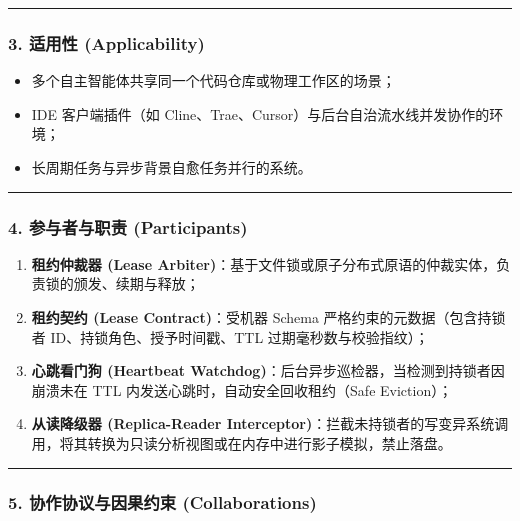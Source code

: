 \begin{center}\rule{0.5\linewidth}{0.5pt}\end{center}

\subsubsection{3. 适用性
(Applicability)}\label{ux9002ux7528ux6027-applicability-9}

\begin{itemize}
\tightlist
\item
  多个自主智能体共享同一个代码仓库或物理工作区的场景；
\item
  IDE 客户端插件（如
  Cline、Trae、Cursor）与后台自治流水线并发协作的环境；
\item
  长周期任务与异步背景自愈任务并行的系统。
\end{itemize}

\begin{center}\rule{0.5\linewidth}{0.5pt}\end{center}

\subsubsection{4. 参与者与职责
(Participants)}\label{ux53c2ux4e0eux8005ux4e0eux804cux8d23-participants-9}

\begin{enumerate}
\def\labelenumi{\arabic{enumi}.}
\tightlist
\item
  \textbf{租约仲裁器 (Lease
  Arbiter)}：基于文件锁或原子分布式原语的仲裁实体，负责锁的颁发、续期与释放；
\item
  \textbf{租约契约 (Lease Contract)}：受机器 Schema
  严格约束的元数据（包含持锁者 ID、持锁角色、授予时间戳、TTL
  过期毫秒数与校验指纹）；
\item
  \textbf{心跳看门狗 (Heartbeat
  Watchdog)}：后台异步巡检器，当检测到持锁者因崩溃未在 TTL
  内发送心跳时，自动安全回收租约（Safe Eviction）；
\item
  \textbf{从读降级器 (Replica-Reader
  Interceptor)}：拦截未持锁者的写变异系统调用，将其转换为只读分析视图或在内存中进行影子模拟，禁止落盘。
\end{enumerate}

\begin{center}\rule{0.5\linewidth}{0.5pt}\end{center}

\subsubsection{5. 协作协议与因果约束
(Collaborations)}\label{ux534fux4f5cux534fux8baeux4e0eux56e0ux679cux7ea6ux675f-collaborations-6}

